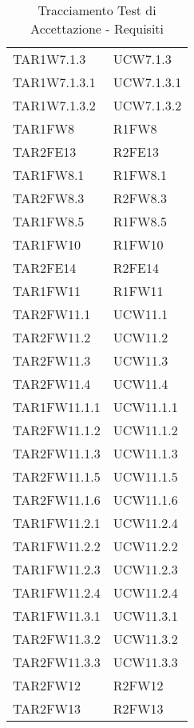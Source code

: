 \begin{table}[H]
\begin{tabular}[t]{ m{}<{\centering}  m{}<{\centering} }
	TAR1W7.1.3 & UCW7.1.3 \\
	TAR1W7.1.3.1 & UCW7.1.3.1 \\
	TAR1W7.1.3.2 & UCW7.1.3.2 \\
	TAR1FW8 & R1FW8 \\
	TAR2FE13 & R2FE13 \\
	TAR1FW8.1 & R1FW8.1 \\
	TAR2FW8.3 & R2FW8.3 \\
	TAR1FW8.5 & R1FW8.5 \\
	TAR1FW10 & R1FW10 \\
	TAR2FE14 & R2FE14  \\
	TAR1FW11 & R1FW11 \\
	TAR2FW11.1 & UCW11.1\\
	TAR2FW11.2 & UCW11.2\\
	TAR2FW11.3 & UCW11.3\\
	TAR2FW11.4 & UCW11.4\\
	TAR1FW11.1.1 & UCW11.1.1\\
	TAR2FW11.1.2 & UCW11.1.2\\
	TAR2FW11.1.3 & UCW11.1.3\\
	TAR2FW11.1.5 & UCW11.1.5\\
	TAR2FW11.1.6 & UCW11.1.6\\
	TAR1FW11.2.1 & UCW11.2.4\\
	TAR1FW11.2.2 & UCW11.2.2\\
	TAR1FW11.2.3 & UCW11.2.3\\
	TAR1FW11.2.4 & UCW11.2.4\\
	TAR1FW11.3.1 & UCW11.3.1\\
	TAR2FW11.3.2 & UCW11.3.2\\
	TAR2FW11.3.3 & UCW11.3.3\\
	TAR2FW12 & R2FW12 \\
	TAR2FW13 & R2FW13 \\

\end{tabular}
\caption{Tracciamento Test di Accettazione - Requisiti}
\end{table}
